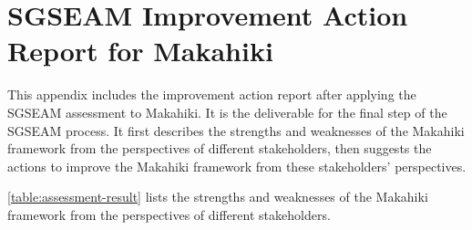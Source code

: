 \chapter{SGSEAM Improvement Action Report for Makahiki}
\label{app:makahiki-improvement-report}

This appendix includes the improvement action report after applying the SGSEAM assessment to Makahiki. It is the deliverable for the final step of the SGSEAM process. It first describes the strengths and weaknesses of the Makahiki framework from the perspectives of different stakeholders, then suggests the actions to improve the Makahiki framework from these stakeholders' perspectives.

\autoref{table:assessment-result} lists the strengths and weaknesses of the Makahiki framework from the perspectives of  different stakeholders.

